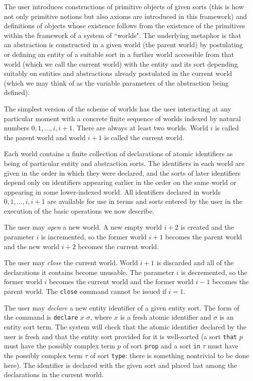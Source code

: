 \documentclass[12pt]{article}
\begin{document}
The user introduces constructions of primitive objects of given sorts (this is how not only primitive notions but also axioms are introduced in this framework) and definitions of objects whose existence follows from the existence of the primitives within the framework of a system of ``worlds".  The underlying metaphor is that an abstraction is constructed in a given world (the parent world) by postulating or defining an entity of a suitable sort in a further world accessible from that world (which we call the current world) with the entity and its sort depending suitably on entities and abstractions already postulated in the current world (which we may think of as the variable parameters of the abstraction being defined).

The simplest version of the scheme of worlds has the user interacting at any particular moment with a concrete finite sequence of worlds indexed by natural numbers $0,1,\ldots,i,i+1$.   There are always at least two worlds.  World $i$ is called the parent world and world $i+1$ is called the current world.

Each world contains a finite collection of declarations of atomic identifiers as being of particular entity and abstraction sorts.  The identifiers in each world are given in the order in which they were declared, and the sorts of later identifiers depend only on identifiers appearing earlier in the order on the same world or appearing  in some lower-indexed world.  All identifiers declared in worlds
$0,1,\ldots,i,i+1$ are available for use in terms and sorts entered by the user in the execution of the basic operations we now describe.

The user may {\em open\/} a new world.  A new empty world $i+2$ is created and the parameter $i$ is incremented, so the former world $i+1$ becomes the parent world
and the new world $i+2$ becomes the current world.

The user may {\em close\/} the current world.  World $i+1$ is discarded and all of the declarations it contains become unusable.  The parameter $i$ is decremented,
so the former world $i$ becomes the current world and the former world $i-1$ becomes the parent world.  The {\tt close} command cannot be issued if $i=1$.

The user may {\em declare\/} a new entity identifier of a given entity sort.  The form of the command is {\tt declare} $x$ $\sigma$, where $x$ is a fresh atomic identifier and $\sigma$ is an entity sort term.  The system will check that the atomic identifier declared by the user is fresh and that the entity sort provided for it is well-sorted (a sort {\tt that} $p$ must have the possibly complex term $p$ of sort {\tt prop} and a sort {\tt in} $\tau$ must have the possibly complex term $\tau$ of sort {\tt type}:  there is something nontrivial to be done here).  The identifier is declared with the given sort and placed last among the declarations in the current world.
\end{document}
